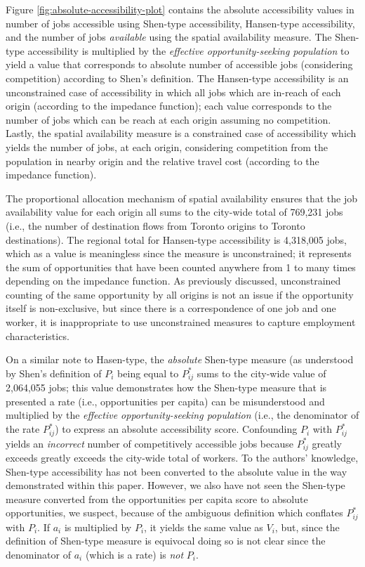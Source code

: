 \documentclass[]{elsarticle} %
\begin{document}
Figure \ref{fig:absolute-accessibility-plot} contains the absolute
accessibility values in number of jobs accessible using Shen-type
accessibility, Hansen-type accessibility, and the number of jobs
\emph{available} using the spatial availability measure. The Shen-type
accessibility is multiplied by the \emph{effective opportunity-seeking
population} to yield a value that corresponds to absolute number of
accessible jobs (considering competition) according to Shen's
definition. The Hansen-type accessibility is an unconstrained case of
accessibility in which all jobs which are in-reach of each origin
(according to the impedance function); each value corresponds to the
number of jobs which can be reach at each origin assuming no
competition. Lastly, the spatial availability measure is a constrained
case of accessibility which yields the number of jobs, at each origin,
considering competition from the population in nearby origin and the
relative travel cost (according to the impedance function).

The proportional allocation mechanism of spatial availability ensures
that the job availability value for each origin all sums to the
city-wide total of 769,231 jobs (i.e., the number of destination flows
from Toronto origins to Toronto destinations). The regional total for
Hansen-type accessibility is 4,318,005 jobs, which as a value is
meaningless since the measure is unconstrained; it represents the sum of
opportunities that have been counted anywhere from 1 to many times
depending on the impedance function. As previously discussed,
unconstrained counting of the same opportunity by all origins is not an
issue if the opportunity itself is non-exclusive, but since there is a
correspondence of one job and one worker, it is inappropriate to use
unconstrained measures to capture employment characteristics.

On a similar note to Hasen-type, the \emph{absolute} Shen-type measure
(as understood by Shen's definition of \(P_i\) being equal to
\(P_{ij}^*\) sums to the city-wide value of 2,064,055 jobs; this value
demonstrates how the Shen-type measure that is presented a rate (i.e.,
opportunities per capita) can be misunderstood and multiplied by the
\emph{effective opportunity-seeking population} (i.e., the denominator
of the rate \(P_{ij}^*\)) to express an absolute accessibility score.
Confounding \(P_i\) with \(P_{ij}^*\) yields an \emph{incorrect} number
of competitively accessible jobs because \(P_{ij}^*\) greatly exceeds
greatly exceeds the city-wide total of workers. To the authors'
knowledge, Shen-type accessibility has not been converted to the
absolute value in the way demonstrated within this paper. However, we
also have not seen the Shen-type measure converted from the
opportunities per capita score to absolute opportunities, we suspect,
because of the ambiguous definition which conflates \(P_{ij}^*\) with
\(P_i\). If \(a_i\) is multiplied by \(P_i\), it yields the same value
as \(V_i\), but, since the definition of Shen-type measure is equivocal
doing so is not clear since the denominator of \(a_i\) (which is a rate)
is \emph{not} \(P_i\).
\end{document}
